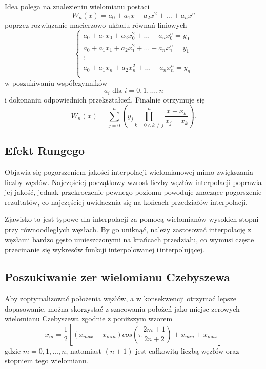 Idea polega na znalezieniu wielomianu postaci
\begin{equation}
W_n(x) = a_0 + a_1x + a_2x^2 + \dots + a_nx^n
\end{equation}
poprzez rozwiązanie macierzowo układu równań liniowych
\begin{equation}
\begin{cases}
	a_0 + a_1x_0 + a_2x_0^2 + \dots + a_nx_0^n = y_0\\
	a_0 + a_1x_1 + a_2x_1^2 + \dots + a_nx_1^n = y_1 \\
	\vdots \\
	a_0 + a_1x_n + a_2x_n^2 + \dots + a_nx_n^n = y_n \\
\end{cases}
\end{equation}
w poszukiwaniu współczynników $$ a_i \mbox{ dla } i = 0,1,\dots,n $$ i dokonaniu odpowiednich przekształceń. Finalnie otrzymuje się
\begin{equation}
W_n(x) = \sum_{j=0}^{n} \left(y_j \prod_{k = 0 \wedge k \neq j}^n\frac{x - x_k}{x_j - x_k} \right).
\label{wzor}
\end{equation}

\subsection{Efekt Rungego}

Objawia się pogorszeniem jakości interpolacji wielomianowej  mimo zwiększania liczby węzłów. Najczęściej początkowy wzrost liczby węzłów interpolacji poprawia jej jakość, jednak przekroczenie pewnego poziomu powoduje znaczące pogorszenie rezultatów, co najczęściej uwidacznia się na końcach przedziałów interpolacji.

Zjawisko to jest typowe dla interpolacji za pomocą wielomianów wysokich stopni przy równoodległych węzłach. By go uniknąć, należy zastosować interpolację z węzłami bardzo gęsto umieszczonymi na krańcach przedziału, co wymusi częste przecinanie się wykresów funkcji interpolowanej i\,interpolującej.

\subsection{Poszukiwanie zer wielomianu Czebyszewa}

Aby zoptymalizować położenia węzłów, a w konsekwencji otrzymać lepsze dopasowanie, można skorzystać z szacowania położeń jako miejsc zerowych wielomianu Czebyszewa zgodnie z poniższym wzorem
\begin{equation}
x_m = \frac{1}{2}\left[(x_{max} - x_{min})cos\left(\pi\frac{2m + 1}{2n + 2}\right) + x_{min} + x_{max}\right]
\label{czeb}
\end{equation}
gdzie $ m = 0,1,\dots,n $, natomiast $ (n + 1) $ jest całkowitą liczbą węzłów oraz stopniem tego wielomianu.
		
